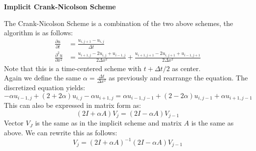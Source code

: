 \documentclass[a4paper,11pt]{article}
\newcommand{\prtl}{\partial}
\newcommand{\vsp}{\vspace{0.2cm}}
\newcommand{\secti}[1]{\begin{center} \Large\bf{{#1}} \end{center}}
\begin{document}
\secti{Implicit Crank-Nicolson Scheme}
    The Crank-Nicolson Scheme is a combination of the two above schemes, the algorithm is as follows:
    \begin{align*}
        \frac{\prtl u}{\prtl t} &= \frac{u_{i,j+1} - u_{i,j}}{\Delta t}\\
        \frac{\prtl^2 u}{\prtl x^2} &= \frac{u_{i+1,j} - 2u_{i,j} + u_{i-1,j}}{2 \Delta x^2} + \frac{u_{i+1,j+1} - 2u_{i,j+1} + u_{i-1,j+1}}{2 \Delta x^2}
    \end{align*}
    Note that this is a time-centered scheme with $t+\Delta t/2$ as center.\vsp\\
    Again we define the same $\alpha =\frac{\Delta t}{\Delta x^2}$ as previously and rearrange the equation. The discretized equation yields:
    \begin{equation*}
        -\alpha u_{i-1,j}+(2+2\alpha)u_{i,j} - \alpha u_{i+1,j} = \alpha u_{i-1,j-1} + (2-2\alpha)u_{i,j-1} + \alpha u_{i+1,j-1}
    \end{equation*}
    This can also be expressed in matrix form as:
    \begin{equation*}
        (2I + \alpha A)V_j = (2I - \alpha A)V_{j-1}
    \end{equation*}
    Vector $V_J$ is the same as in the implicit scheme and matrix $A$ is the same as above.
    We can rewrite this as follows:
    \begin{equation*}
        V_j = (2I + \alpha A)^{-1}(2I - \alpha A)V_{j-1}
    \end{equation*}
\end{document}
